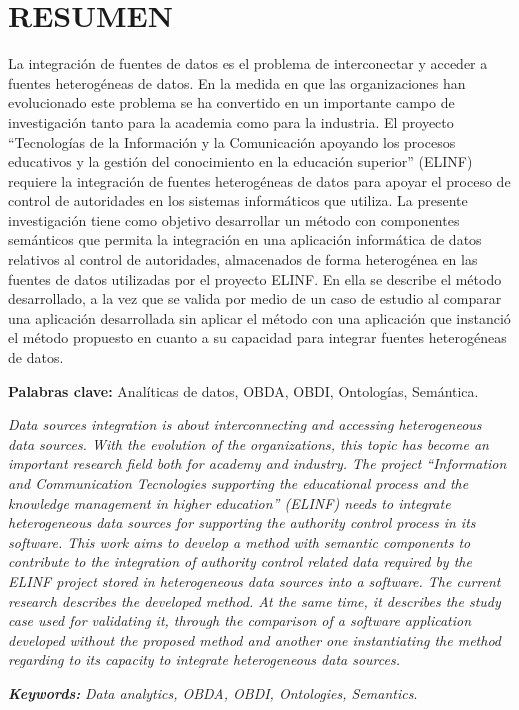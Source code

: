 \chapter*{\large RESUMEN}

La integración de fuentes de datos es el problema de interconectar y acceder a fuentes heterogéneas de datos. En la medida en que las organizaciones han evolucionado este problema se ha convertido en un importante campo de investigación tanto para la academia como para la industria. El proyecto ``Tecnologías de la Información y la Comunicación apoyando los procesos educativos y la gestión del conocimiento en la educación superior'' (ELINF) requiere la integración de fuentes heterogéneas de datos para apoyar el proceso de control de autoridades en los sistemas informáticos que utiliza. La presente investigación tiene como objetivo desarrollar un método con componentes semánticos que permita la integración en una aplicación informática de datos relativos al control de autoridades, almacenados de forma heterogénea en las fuentes de datos utilizadas por el proyecto ELINF. En ella se describe el método desarrollado, a la vez que se valida por medio de un caso de estudio al comparar una aplicación desarrollada sin aplicar el método con una aplicación que instanció el método propuesto en cuanto a su capacidad para integrar fuentes heterogéneas de datos.

\textbf{Palabras clave:} Analíticas de datos, OBDA, OBDI, Ontologías, Semántica.

\textit{Data sources integration is about interconnecting and accessing heterogeneous data sources. With the evolution of the organizations, this topic has become an important research field both for academy and industry. The project ``Information and Communication Tecnologies supporting the educational process and the knowledge management in higher education'' (ELINF) needs to integrate heterogeneous data sources for supporting the authority control process in its software. This work aims to develop a method with semantic components to contribute to the integration of authority control related data required by the ELINF project stored in heterogeneous data sources  into a software. The current research describes the developed method. At the same time, it describes the study case used for validating it, through the comparison of a software application developed without the proposed method and another one instantiating the method regarding to its capacity to integrate heterogeneous data sources.}

\textit{\textbf{Keywords: }} \textit{Data analytics, OBDA, OBDI, Ontologies, Semantics}.